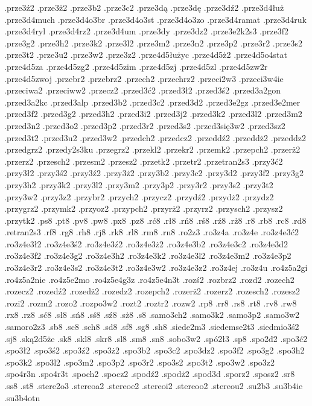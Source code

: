 {.prze3ź2
.prze3ż2
.prze3b2
.prze3c2
.prze3dą
.prze3dę
.prze3dź2
.prze3d4łuż
.prze3d4much
.prze3d4o3br
.prze3d4o3st
.prze3d4o3zo
.prze3d4ramat
.prze3d4ruk
.prze3d4ryl
.prze3d4rz2
.prze3d4um
.prze3dy
.prze3dz2
.prze3e2k2s3
.prze3f2
.prze3g2
.prze3h2
.prze3k2
.prze3l2
.prze3m2
.prze3n2
.prze3p2
.prze3r2
.prze3s2
.prze3t2
.prze3u2
.prze3w2
.prze3z2
.prze4d5łużyc
.prze4d5ż2
.prze4d5o4stat
.prze4d5za
.prze4d5zg2
.prze4d5zim
.prze4d5zj
.prze4d5zl
.prze4d5zw2r
.prze4d5zwoj
.przebr2
.przebrz2
.przech2
.przechrz2
.przeci2w3
.przeci3w4ie
.przeciwa2
.przeciww2
.przecz2
.przed3ć2
.przed3ł2
.przed3ś2
.przed3a2gon
.przed3a2kc
.przed3alp
.przed3b2
.przed3c2
.przed3d2
.przed3e2gz
.przed3e2mer
.przed3f2
.przed3g2
.przed3h2
.przed3i2
.przed3j2
.przed3k2
.przed3l2
.przed3m2
.przed3n2
.przed3o2
.przed3p2
.przed3r2
.przed3s2
.przed3się3w2
.przed3sz2
.przed3t2
.przed3u2
.przed3w2
.przedch2
.przedcz2
.przeddź2
.przeddż2
.przeddz2
.przedgrz2
.przedy2s3ku
.przegrz2
.przekl2
.przekr2
.przemk2
.przepch2
.przerż2
.przerz2
.przesch2
.przesm2
.przesz2
.przetk2
.przetr2
.przetran2s3
.przy3ć2
.przy3ł2
.przy3ś2
.przy3ź2
.przy3ż2
.przy3b2
.przy3c2
.przy3d2
.przy3f2
.przy3g2
.przy3h2
.przy3k2
.przy3l2
.przy3m2
.przy3p2
.przy3r2
.przy3s2
.przy3t2
.przy3w2
.przy3z2
.przybr2
.przych2
.przycz2
.przydź2
.przydż2
.przydz2
.przygrz2
.przymk2
.przyoz2
.przypch2
.przyrż2
.przyrz2
.przysch2
.przysz2
.przytk2
.ps8
.pt8
.pv8
.pw8
.px8
.pz8
.rć8
.rł8
.rń8
.rś8
.rź8
.rż8
.r8
.rb8
.rc8
.rd8
.retran2s3
.rf8
.rg8
.rh8
.rj8
.rk8
.rl8
.rm8
.rn8
.ro2z3
.ro3z4a
.ro3z4e
.ro3z4e3ć2
.ro3z4e3ł2
.ro3z4e3ś2
.ro3z4e3ź2
.ro3z4e3ż2
.ro3z4e3b2
.ro3z4e3c2
.ro3z4e3d2
.ro3z4e3f2
.ro3z4e3g2
.ro3z4e3h2
.ro3z4e3k2
.ro3z4e3l2
.ro3z4e3m2
.ro3z4e3p2
.ro3z4e3r2
.ro3z4e3s2
.ro3z4e3t2
.ro3z4e3w2
.ro3z4e3z2
.ro3z4ej
.ro3z4u
.ro4z5a2gi
.ro4z5a2nie
.ro4z5e2mo
.ro4z5e4g3z
.ro4z5e4n3t
.rozś2
.rozbrz2
.rozd2
.rozech2
.rozecz2
.rozedź2
.rozedż2
.rozedz2
.rozepch2
.rozerż2
.rozerz2
.rozesch2
.rozesz2
.rozi2
.rozm2
.rozo2
.rozpo3w2
.rozt2
.roztr2
.rozw2
.rp8
.rr8
.rs8
.rt8
.rv8
.rw8
.rx8
.rz8
.sć8
.sł8
.sń8
.sś8
.sź8
.sż8
.s8
.samo3ch2
.samo3k2
.samo3p2
.samo3w2
.samoro2z3
.sb8
.sc8
.sch8
.sd8
.sf8
.sg8
.sh8
.siede2m3
.siedemse2t3
.siedmio3ś2
.sj8
.ską2d5że
.sk8
.skl8
.skr8
.sl8
.sm8
.sn8
.sobo3w2
.spó2ł3
.sp8
.spo2d2
.spo3ć2
.spo3ł2
.spo3ś2
.spo3ź2
.spo3ż2
.spo3b2
.spo3c2
.spo3dz2
.spo3f2
.spo3g2
.spo3h2
.spo3k2
.spo3l2
.spo3m2
.spo3p2
.spo3r2
.spo3s2
.spo3t2
.spo3w2
.spo3z2
.spo4r3n
.spo4r3t
.spoch2
.spocz2
.spodź2
.spodż2
.spod3d
.sporz2
.sposz2
.sr8
.ss8
.st8
.stere2o3
.stereoa2
.stereoe2
.stereoi2
.stereoo2
.stereou2
.su2b3
.su3b4ie
.su3b4otn
}
